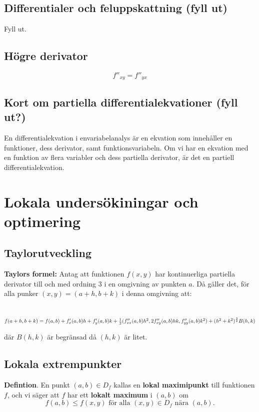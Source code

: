\documentclass[a4paper,12pt]{article}
\begin{document}
\subsection{Differentialer och feluppskattning (fyll ut)}
Fyll ut.

\subsection{Högre derivator}
\[
    f''_{xy} = f''_{yx}
\]

\subsection{Kort om partiella differentialekvationer (fyll ut?)}
En differentialekvation i envariabelanalys är en ekvation som innehåller en funktioner, dess derivator, samt funktionsvariabeln.
Om vi har en ekvation med en funktion av flera variabler och dess partiella derivator, är det en partiell differentialekvation.

\section{Lokala undersökiningar och optimering}
\subsection{Taylorutveckling}
\textbf{Taylors formel:} Antag att funktionen $f(x, y)$ har kontinuerliga partiella derivator till och med ordning 3 i en omgivning av punkten $a$.
Då gäller det, för alla punker $(x, y) = (a + h, b + k)$ i denna omgivning att:\\\\
\begin{multiline}
    $f(a + h, b + k) = f(a, b) + f'_x(a, b)h + f'_y(a, b)k + \\
    \frac{1}{2}(f''_{xx}(a, b)h^2, 2f''_{xy}(a, b)hk, f''_{yy}(a, b)k^2) + (h^2 + k^2)^{\frac{3}{2}}B(h, k)$
\end{multiline}
där $B(h,k)$ är begränsad då $(h, k)$ är litet.

\subsection{Lokala extrempunkter}
\textbf{Defintion}. En punkt $(a, b) \in D_f$ kallas en \textbf{lokal maximipunkt} till funktionen $f$, 
och vi säger att $f$ har ett \textbf{lokalt maximum} i $(a, b)$ om
\[
    f(a, b) \leq f(x, y) \text{ för alla } (x, y) \in D_f \text{ nära } (a, b).
\]
\end{document}
